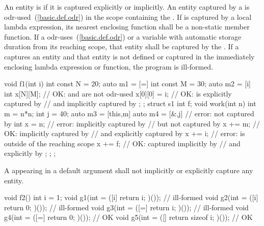 \pnum
An entity is  if it is captured explicitly or implicitly. An entity
captured by a  is odr-used~(\ref{basic.def.odr}) in the scope
containing the . If  is captured by a local
lambda expression, its nearest enclosing function shall be a non-static member function.
If a  odr-uses~(\ref{basic.def.odr})  or a
variable with automatic storage duration from its reaching scope, that
entity shall be captured by the . If a
 captures an entity and that entity is not defined or
captured in the immediately enclosing lambda expression or function, the program is
ill-formed. \enterexample
\begin{codeblock}
void f1(int i) {
  int const N = 20;
  auto m1 = [=]{
    int const M = 30;
    auto m2 = [i]{
      int x[N][M];              // OK:  and  are not odr-used
      x[0][0] = i;              // OK:  is explicitly captured by 
                                // and implicitly captured by 
    };
  };
  struct s1 {
    int f;
    void work(int n) {
      int m = n*n;
      int j = 40;
      auto m3 = [this,m] {
        auto m4 = [&,j] {       // error:  not captured by 
          int x = n;            // error:  implicitly captured by 
                                // but not captured by 
          x += m;               // OK:  implicitly captured by 
                                // and explicitly captured by 
          x += i;               // error:  is outside of the reaching scope
          x += f;               // OK:  captured implicitly by 
                                // and explicitly by 
        };
      };
    }
  };
}
\end{codeblock}
\exitexample

\pnum
A  appearing in a default argument shall not
implicitly or explicitly capture any entity. \enterexample

\begin{codeblock}
void f2() {
  int i = 1;
  void g1(int = ([i]{ return i; })());        // ill-formed
  void g2(int = ([i]{ return 0; })());        // ill-formed
  void g3(int = ([=]{ return i; })());        // ill-formed
  void g4(int = ([=]{ return 0; })());        // OK
  void g5(int = ([]{ return sizeof i; })());  // OK
}
\end{codeblock}
\exitexample

